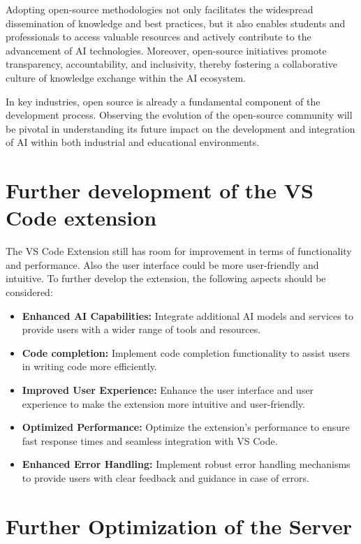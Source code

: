 Adopting open-source methodologies not only facilitates the widespread dissemination of knowledge and best practices, but it also enables students and professionals to access valuable resources and actively contribute to the advancement of AI technologies. Moreover, open-source initiatives promote transparency, accountability, and inclusivity, thereby fostering a collaborative culture of knowledge exchange within the AI ecosystem.

In key industries, open source is already a fundamental component of the development process. Observing the evolution of the open-source community will be pivotal in understanding its future impact on the development and integration of AI within both industrial and educational environments.

\section{Further development of the VS Code extension}

The VS Code Extension still has room for improvement in terms of functionality and performance. Also the user interface could be more user-friendly and intuitive. To further develop the extension, the following aspects should be considered:

\begin{itemize}
    \item \textbf{Enhanced AI Capabilities:} Integrate additional AI models and services to provide users with a wider range of tools and resources.
    \item \textbf{Code completion:} Implement code completion functionality to assist users in writing code more efficiently.
    \item \textbf{Improved User Experience:} Enhance the user interface and user experience to make the extension more intuitive and user-friendly.
    \item \textbf{Optimized Performance:} Optimize the extension’s performance to ensure fast response times and seamless integration with VS Code.
    \item \textbf{Enhanced Error Handling:} Implement robust error handling mechanisms to provide users with clear feedback and guidance in case of errors.
\end{itemize} 

\section{Further Optimization of the Server}

